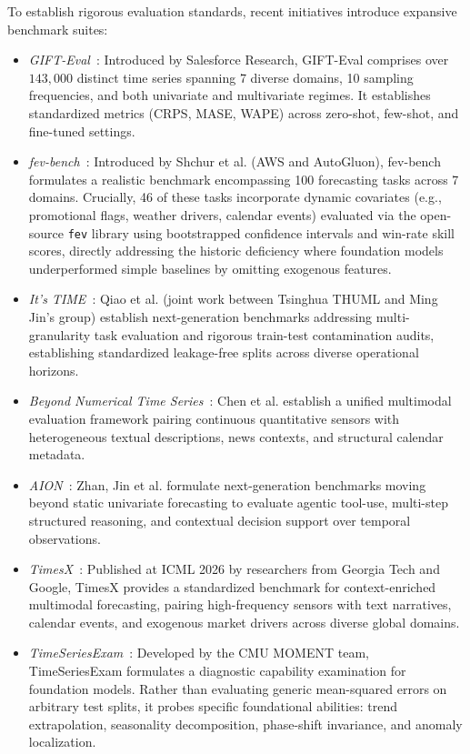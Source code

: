 To establish rigorous evaluation standards, recent initiatives introduce expansive benchmark suites:
\begin{itemize}[leftmargin=*]
    \item \emph{GIFT-Eval}~\cite{salesforce2024gifteval}: Introduced by Salesforce Research, GIFT-Eval comprises over $143{,}000$ distinct time series spanning 7 diverse domains, 10 sampling frequencies, and both univariate and multivariate regimes. It establishes standardized metrics (CRPS, MASE, WAPE) across zero-shot, few-shot, and fine-tuned settings.
    \item \emph{fev-bench}~\cite{shchur2025fevbench}: Introduced by Shchur et al. (AWS and AutoGluon), fev-bench formulates a realistic benchmark encompassing 100 forecasting tasks across 7 domains. Crucially, 46 of these tasks incorporate dynamic covariates (e.g., promotional flags, weather drivers, calendar events) evaluated via the open-source \texttt{fev} library using bootstrapped confidence intervals and win-rate skill scores, directly addressing the historic deficiency where foundation models underperformed simple baselines by omitting exogenous features.
    \item \emph{It's TIME}~\cite{qiao2026time}: Qiao et al. (joint work between Tsinghua THUML and Ming Jin's group) establish next-generation benchmarks addressing multi-granularity task evaluation and rigorous train-test contamination audits, establishing standardized leakage-free splits across diverse operational horizons.
    \item \emph{Beyond Numerical Time Series}~\cite{chen2026beyondnumerical}: Chen et al. establish a unified multimodal evaluation framework pairing continuous quantitative sensors with heterogeneous textual descriptions, news contexts, and structural calendar metadata.
    \item \emph{AION}~\cite{zhan2026aion}: Zhan, Jin et al. formulate next-generation benchmarks moving beyond static univariate forecasting to evaluate agentic tool-use, multi-step structured reasoning, and contextual decision support over temporal observations.
    \item \emph{TimesX}~\cite{liu2026timesx}: Published at ICML 2026 by researchers from Georgia Tech and Google, TimesX provides a standardized benchmark for context-enriched multimodal forecasting, pairing high-frequency sensors with text narratives, calendar events, and exogenous market drivers across diverse global domains.
    \item \emph{TimeSeriesExam}~\cite{cai2024timeseriesexam}: Developed by the CMU MOMENT team, TimeSeriesExam formulates a diagnostic capability examination for foundation models. Rather than evaluating generic mean-squared errors on arbitrary test splits, it probes specific foundational abilities: trend extrapolation, seasonality decomposition, phase-shift invariance, and anomaly localization.

\end{itemize}
